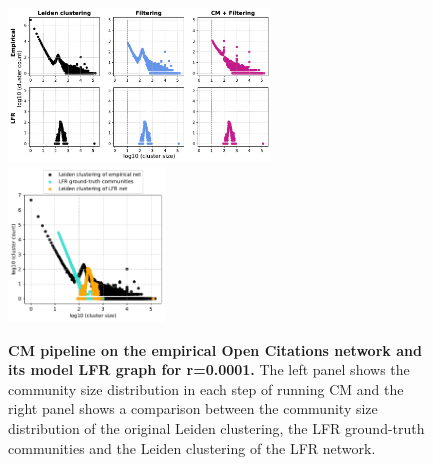 \documentclass[a4paper]{article}   	%
\begin{document}
\begin{figure}[h!]
\centering
\includegraphics[width=0.62\textwidth]{figs/oc_cm_steps_lfr0001.pdf}
\includegraphics[width=0.37\textwidth]{figs/oc_0001_cm_size.pdf}
\caption[CM pipeline on the empirical Open Citations network and its model LFR graph for r=0.0001]{\textbf{CM pipeline on the empirical Open Citations network and its model LFR graph for r=0.0001.} The left panel shows the community size distribution in each step of running CM and the right panel shows a comparison between the community size distribution of the original Leiden clustering, the LFR ground-truth communities and the Leiden clustering of the LFR network.}
\label{fig:oc-cm-lfr-0001}
\end{figure}
\end{document}
